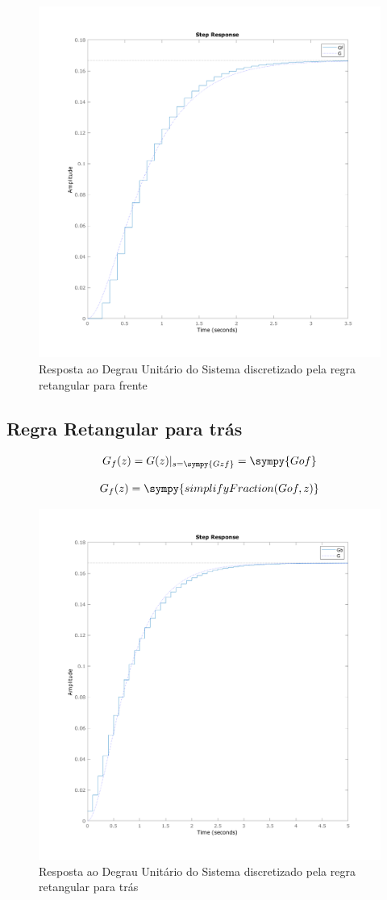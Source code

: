 \documentclass[a4paper,11pt]{article}
\begin{document}
\begin{figure}[H]
    \centering
    \includegraphics[width=0.8\linewidth]{img/exsim2-plot-g-forward.png}
    \caption{Resposta ao Degrau Unitário do Sistema discretizado pela regra retangular para frente}
\end{figure}

\subsection{Regra Retangular para trás}

$$
G_f(z) =  G(z)|_{s = \sympy{Gzf}} = \sympy{Gof}
$$

\begin{equation}
    G_f(z) = \sympy{simplifyFraction(Gof,z)}
\end{equation}

\begin{figure}[H]
    \centering
    \includegraphics[width=0.8\linewidth]{img/exsim2-plot-g-backward.png}
    \caption{Resposta ao Degrau Unitário do Sistema discretizado pela regra retangular para trás}
\end{figure}
\end{document}

